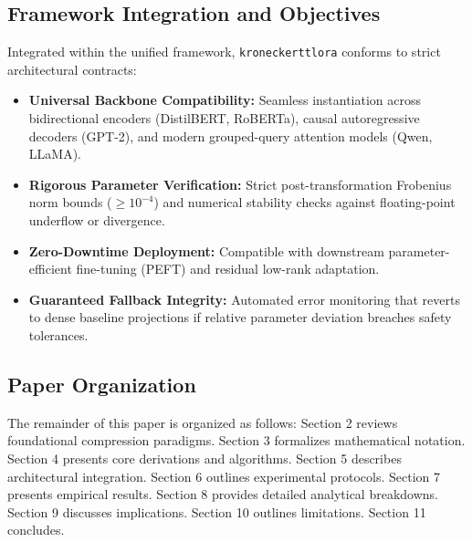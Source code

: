\subsection{Framework Integration and Objectives}
Integrated within the unified framework, \texttt{kroneckerttlora} conforms to strict architectural contracts:
\begin{itemize}
\item \textbf{Universal Backbone Compatibility:} Seamless instantiation across bidirectional encoders (DistilBERT, RoBERTa), causal autoregressive decoders (GPT-2), and modern grouped-query attention models (Qwen, LLaMA).
\item \textbf{Rigorous Parameter Verification:} Strict post-transformation Frobenius norm bounds ($\ge 10^{-4}$) and numerical stability checks against floating-point underflow or divergence.
\item \textbf{Zero-Downtime Deployment:} Compatible with downstream parameter-efficient fine-tuning (PEFT) and residual low-rank adaptation.
\item \textbf{Guaranteed Fallback Integrity:} Automated error monitoring that reverts to dense baseline projections if relative parameter deviation breaches safety tolerances.
\end{itemize}

\subsection{Paper Organization}
The remainder of this paper is organized as follows: Section 2 reviews foundational compression paradigms. Section 3 formalizes mathematical notation. Section 4 presents core derivations and algorithms. Section 5 describes architectural integration. Section 6 outlines experimental protocols. Section 7 presents empirical results. Section 8 provides detailed analytical breakdowns. Section 9 discusses implications. Section 10 outlines limitations. Section 11 concludes.
